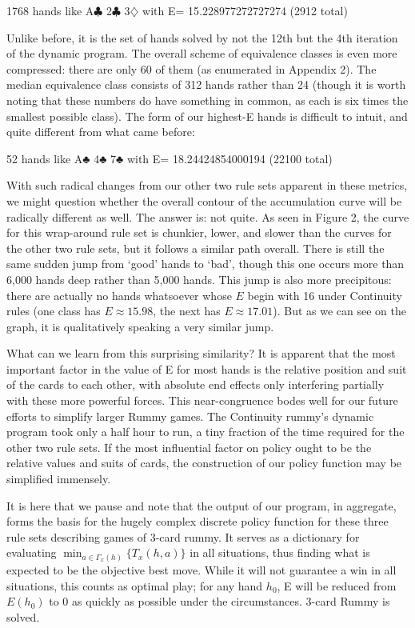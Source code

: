 \documentclass[paper=a4, fontsize=11pt,twoside]{report}   %
\begin{document}
1768 hands like A$\clubsuit$ 2$\clubsuit$ 3$\diamondsuit$ with E= 15.228977272727274 (2912 total) 

Unlike before, it is the set of hands solved by not the 12th but the 4th iteration of the dynamic program. The overall scheme of equivalence classes is even more compressed: there are only 60 of them (as enumerated in Appendix 2). The median equivalence class consists of 312 hands rather than 24 (though it is worth noting that these numbers do have something in common, as each is six times the smallest possible class). The form of our highest-E hands is difficult to intuit, and quite different from what came before: 

52 hands like A♣ 4♣ 7♣ with E= 18.24424854000194 (22100 total)

With such radical changes from our other two rule sets apparent in these metrics, we might question whether the overall contour of the accumulation curve will be radically different as well. The answer is: not quite. As seen in Figure 2, the curve for this wrap-around rule set is chunkier, lower, and slower than the curves for the other two rule sets, but it follows a similar path overall. There is still the same sudden jump from ‘good’ hands to ‘bad’, though this one occurs more than 6,000 hands deep rather than 5,000 hands. This jump is also more precipitous: there are  actually no hands whatsoever whose $E$ begin with 16 under Continuity rules (one class has $E \approx 15.98$, the next has $E \approx 17.01$). But as we can see on the graph, it is qualitatively speaking a very similar jump. 

What can we learn from this surprising similarity? It is apparent that the most important factor in the value of E for most hands is the relative position and suit of the cards to each other, with absolute end effects only interfering partially with these more powerful forces.  This near-congruence bodes well for our future efforts to simplify larger Rummy games. The Continuity rummy’s dynamic program took only a half hour to run, a tiny fraction of the time required for the other two rule sets. If the most influential factor on policy ought to be the relative values and suits of cards, the construction of our policy function may be simplified immensely.

It is here that we pause and note that the output of our program, in aggregate, forms the basis for the hugely complex discrete policy function for these three rule sets describing games of 3-card rummy. It serves as a dictionary for evaluating $\min_{a\in \Gamma_x(h)}\{T_x(h,a)\}$ in all situations, thus finding what is expected to be the objective best move. While it will not guarantee a win in all situations, this counts as optimal play; for any hand $h_0$, E will be reduced from $E(h_0)$ to 0 as quickly as possible under the circumstances. 3-card Rummy is solved. 
\end{document}
